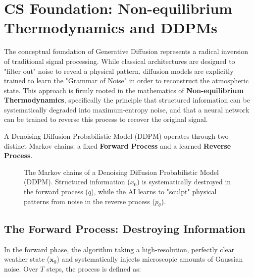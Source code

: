 \section{CS Foundation: Non-equilibrium Thermodynamics and DDPMs}

The conceptual foundation of Generative Diffusion represents a radical inversion of traditional signal processing. While classical architectures are designed to "filter out" noise to reveal a physical pattern, diffusion models are explicitly trained to learn the "Grammar of Noise" in order to reconstruct the atmospheric state. This approach is firmly rooted in the mathematics of \textbf{Non-equilibrium Thermodynamics}, specifically the principle that structured information can be systematically degraded into maximum-entropy noise, and that a neural network can be trained to reverse this process to recover the original signal.

A Denoising Diffusion Probabilistic Model (DDPM) operates through two distinct Markov chains: a fixed \textbf{Forward Process} and a learned \textbf{Reverse Process}.

\begin{figure}[H]
\centering
{}
\caption{The Markov chains of a Denoising Diffusion Probabilistic Model (DDPM). Structured information ($x_0$) is systematically destroyed in the forward process ($q$), while the AI learns to "sculpt" physical patterns from noise in the reverse process ($p_\theta$).}
\label{fig:diffusion_tikz}
\end{figure}

\subsection{The Forward Process: Destroying Information}
In the forward phase, the algorithm taking a high-resolution, perfectly clear weather state ($\mathbf{x}_0$) and systematically injects microscopic amounts of Gaussian noise. Over $T$ steps, the process is defined as:

